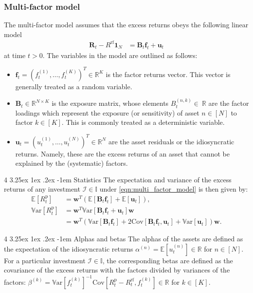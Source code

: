\documentclass[12pt]{article}
\makeatletter
\renewcommand\paragraph{%
	\@startsection{paragraph}
	{4}
	{\z@}
	{3.25ex \@plus1ex \@minus.2ex}
	{-1em}
	{\normalfont\normalsize\bfseries\maybe@addperiod}%
}
\newcommand{\maybe@addperiod}[1]{%
	#1\@addpunct{.}%
}
\makeatother
\begin{document}
\subsubsection{Multi-factor model} The multi-factor model assumes that the excess returns obeys the following linear model
\begin{align}
	\mathbf{R}_t - R^{\text{rf}} \mathbf{1}_N 
	&= \mathbf{B}_t \mathbf{f}_t + \mathbf{u}_t
	\label{eqn:multi_factor_model}
\end{align}
at time $t>0$. The variables in the model are outlined as follows:
\begin{itemize}
	\item $\mathbf{f}_t = (f_t^{(1)}, \dots, f_t^{(K)})^T \in \mathbb{R}^K$ is the factor returns vector. This vector is generally treated as a random variable.
	\item $\mathbf{B}_t \in \mathbb{R}^{N \times K}$ is the exposure matrix, whose elements $B_t^{(n, k)} \in\ \mathbb{R}$ are the factor loadings which represent the exposure (or sensitivity) of asset $n \in [N]$ to factor $k \in [K]$. This is commonly treated as a deterministic variable.
	\item $\mathbf{u}_t = (u_t^{(1)}, \dots, u_t^{(N)})^T \in \mathbb{R}^N$ are the asset residuals or the idiosyncratic returns. Namely, these are the excess returns of an asset that cannot be explained by the (systematic) factors.
\end{itemize}

\paragraph{Statistics} The expectation and variance of the excess returns of any investment $\mathcal{I} \in \mathbb{I}$ under \eqref{eqn:multi_factor_model} is then given by:
\begin{align}
	\mathbb{E}[R_t^{\text{p}}] &= \mathbf{w}^T (\mathbb{E}[\mathbf{B}_t \mathbf{f}_t] + \mathbb{E}[\mathbf{u}_t]),
	\\
	\mathbb{V}\text{ar}[R_t^{\text{p}}] 
	&= \mathbf{w}^T \mathbb{V}\text{ar}[\mathbf{B}_t \mathbf{f}_t + \mathbf{u}_t] \mathbf{w}
	\\
	&= \mathbf{w}^T \left(\mathbb{V}\text{ar}[\mathbf{B}_t \mathbf{f}_t] + 2\text{Cov}[\mathbf{B}_t \mathbf{f}_t, \mathbf{u}_t] + \mathbb{V}\text{ar}[\mathbf{u}_t]\right) \mathbf{w}.
\end{align}

\paragraph{Alphas and betas} The alphas of the assets are defined as the expectation of the idiosyncratic returns $\alpha^{(n)} = \mathbb{E}[u^{(n)}_t] \in \mathbb{R}$ for $n \in [N]$. For a particular investment $\mathcal{I} \in \mathbb{I}$, the corresponding betas are defined as the covariance of the excess returns with the factors divided by variances of the factors: $\beta^{(k)} = \mathbb{V}\text{ar}[f_t^{(k)}]^{-1} \text{Cov}[R_t^{\text{p}} - R^{\text{rf}}_t, f_t^{(k)}] \in \mathbb{R}$ for $k \in [K]$.
\end{document}
